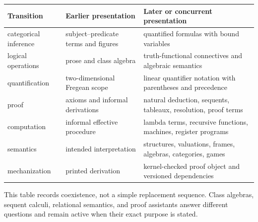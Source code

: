 \begin{tabularx}{\textwidth}{@{}l X X@{}}
\toprule
Transition & Earlier presentation & Later or concurrent presentation \\
\midrule
categorical inference & subject--predicate terms and figures & quantified formulas with bound variables \\
logical operations & prose and class algebra & truth-functional connectives and algebraic semantics \\
quantification & two-dimensional Fregean scope & linear quantifier notation with parentheses and precedence \\
proof & axioms and informal derivations & natural deduction, sequents, tableaux, resolution, proof terms \\
computation & informal effective procedure & lambda terms, recursive functions, machines, register programs \\
semantics & intended interpretation & structures, valuations, frames, algebras, categories, games \\
mechanization & printed derivation & kernel-checked proof object and versioned dependencies \\
\bottomrule
\end{tabularx}

This table records coexistence, not a simple replacement sequence. Class
algebras, sequent calculi, relational semantics, and proof assistants answer
different questions and remain active when their exact purpose is stated.
